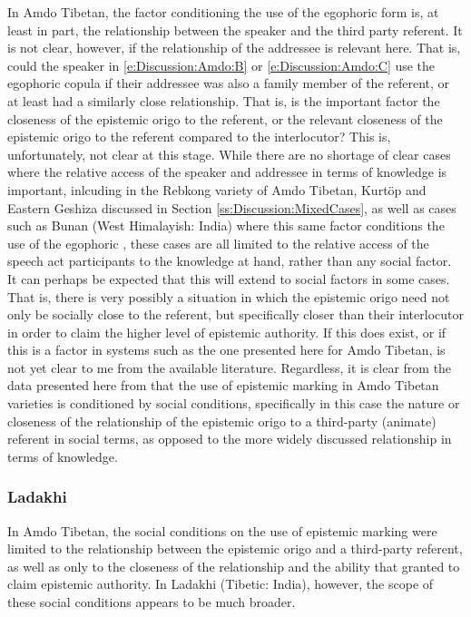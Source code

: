 In Amdo Tibetan, the factor conditioning the use of the egophoric form is, at least in part, the relationship between the speaker and the third party referent. It is not clear, however, if the relationship of the addressee is relevant here. That is, could the speaker in \ref{e:Discussion:Amdo:B} or \ref{e:Discussion:Amdo:C} use the egophoric copula if their addressee was also a family member of the referent, or at least had a similarly close relationship. That is, is the important factor the closeness of the epistemic origo to the referent, or the relevant closeness of the epistemic origo to the referent compared to the interlocutor? This is, unfortunately, not clear at this stage. While there are no shortage of clear cases where the relative access of the speaker and addressee in terms of knowledge is important, inlcuding in the Rebkong variety of Amdo Tibetan, Kurtöp and Eastern Geshiza discussed in Section \ref{ss:Discussion:MixedCases}, as well as cases such as Bunan (West Himalayish: India) where this same factor conditions the use of the egophoric \cite[469]{Widmer2014}, these cases are all limited to the relative access of the speech act participants to the knowledge at hand, rather than any social factor. It can perhaps be expected that this will extend to social factors in some cases. That is, there is very possibly a situation in which the epistemic origo need not only be socially close to the referent, but specifically closer than their interlocutor in order to claim the higher level of epistemic authority. If this does exist, or if this is a factor in systems such as the one presented here for Amdo Tibetan, is not yet clear to me from the available literature. Regardless, it is clear from the data presented here from  that the use of epistemic marking in Amdo Tibetan varieties is conditioned by social conditions, specifically in this case the nature or closeness of the relationship of the epistemic origo to a third-party (animate) referent in social terms, as opposed to the more widely discussed relationship in terms of knowledge.

\subsubsection{Ladakhi}\label{sss:Discussion:LadakhiCase}
In Amdo Tibetan, the social conditions on the use of epistemic marking were limited to the relationship between the epistemic origo and a third-party referent, as well as only to the closeness of the relationship and the ability that granted to claim epistemic authority. In Ladakhi (Tibetic: India), however, the scope of these social conditions appears to be much broader.

